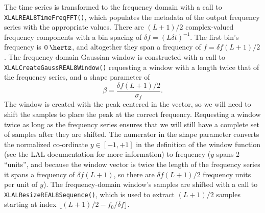 \documentclass[10pt]{article}
\begin{document}
The time series is transformed to the frequency domain with a call to
\texttt{XLALREAL8TimeFreqFFT()}, which populates the metadata of the output
frequency series with the appropriate values.  There are \((L + 1) / 2\)
complex-valued frequency components with a bin spacing of \(\delta f = (L
\delta t)^{-1}\).  The first bin's frequency is \(\unit{0}{\hertz}\), and
altogether they span a frequency of \(f = \delta f (L + 1) / 2\).  The
frequency domain Gaussian window is constructed with a call to
\texttt{XLALCreateGaussREAL8Window()} requesting a window with a length
twice that of the frequency series, and a shape parameter of
\begin{equation}
\beta
   = \frac{\delta f (L + 1) / 2}{\sigma_{f}}.
\end{equation}
The window is created with the peak centered in the vector, so we will need
to shift the samples to place the peak at the correct frequency.
Requesting a window twice as long as the frequency series ensures that we
will still have a complete set of samples after they are shifted.  The
numerator in the shape parameter converts the normalized co-ordinate \(y
\in [-1, +1]\) in the definition of the window function (see the LAL
documentation for more information) to frequency (\(y\) spans 2 ``units'',
and because the window vector is twice the length of the frequency series
it spans a frequency of \(\delta f (L + 1)\), so there are \(\delta f (L +
1) / 2\) frequency units per unit of \(y\)).  The frequency-domain window's
samples are shifted with a call to \texttt{XLALResizeREAL8Sequence()},
which is used to extract \((L + 1) / 2\) samples starting at index
\(\lfloor (L + 1) / 2 - f_{0} / \delta f \rfloor\).
\end{document}
